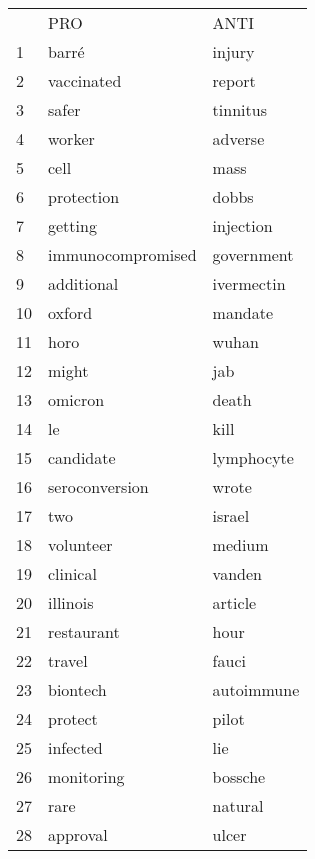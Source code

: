 \documentclass[11pt]{article}
\begin{document}
\begin{table}[H]
    \begin{tabular}{|l|l|l|}
       & PRO               & ANTI          \\
    1  & barré             & injury        \\
    2  & vaccinated        & report        \\
    3  & safer             & tinnitus      \\
    4  & worker            & adverse       \\
    5  & cell              & mass          \\
    6  & protection        & dobbs         \\
    7  & getting           & injection     \\
    8  & immunocompromised & government    \\
    9  & additional        & ivermectin    \\
    10 & oxford            & mandate       \\
    11 & horo              & wuhan         \\
    12 & might             & jab           \\
    13 & omicron           & death         \\
    14 & le                & kill          \\
    15 & candidate         & lymphocyte    \\
    16 & seroconversion    & wrote         \\
    17 & two               & israel        \\
    18 & volunteer         & medium        \\
    19 & clinical          & vanden        \\
    20 & illinois          & article       \\
    21 & restaurant        & hour          \\
    22 & travel            & fauci         \\
    23 & biontech          & autoimmune    \\
    24 & protect           & pilot         \\
    25 & infected          & lie           \\
    26 & monitoring        & bossche       \\
    27 & rare              & natural       \\
    28 & approval          & ulcer         \\

\end{tabular}
\end{table}
\end{document}
